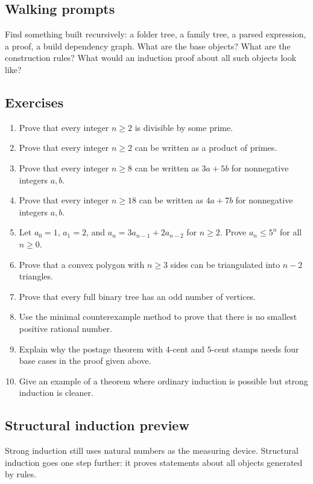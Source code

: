 \subsection{Walking prompts}

\begin{walkbox}
Find something built recursively: a folder tree, a family tree, a parsed expression, a proof, a build dependency graph. What are the base objects? What are the construction rules? What would an induction proof about all such objects look like?
\end{walkbox}

\subsection{Exercises}

\begin{enumerate}
\item Prove that every integer $n\geq2$ is divisible by some prime.
\item Prove that every integer $n\geq2$ can be written as a product of primes.
\item Prove that every integer $n\geq8$ can be written as $3a+5b$ for nonnegative integers $a,b$.
\item Prove that every integer $n\geq18$ can be written as $4a+7b$ for nonnegative integers $a,b$.
\item Let $a_0=1$, $a_1=2$, and $a_n=3a_{n-1}+2a_{n-2}$ for $n\geq2$. Prove $a_n\leq5^n$ for all $n\geq0$.
\item Prove that a convex polygon with $n\geq3$ sides can be triangulated into $n-2$ triangles.
\item Prove that every full binary tree has an odd number of vertices.
\item Use the minimal counterexample method to prove that there is no smallest positive rational number.
\item Explain why the postage theorem with $4$-cent and $5$-cent stamps needs four base cases in the proof given above.
\item Give an example of a theorem where ordinary induction is possible but strong induction is cleaner.
\end{enumerate}

\subsection{Structural induction preview}

Strong induction still uses natural numbers as the measuring device. Structural induction goes one step further: it proves statements about all objects generated by rules.

